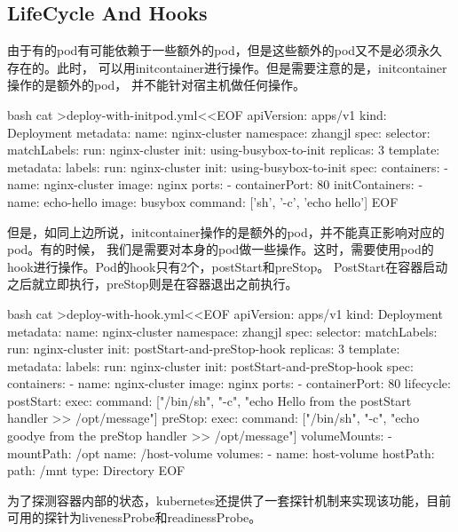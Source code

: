 \subsection{LifeCycle And Hooks}
由于有的pod有可能依赖于一些额外的pod，但是这些额外的pod又不是必须永久存在的。此时，
可以用initcontainer进行操作。但是需要注意的是，initcontainer操作的是额外的pod，
并不能针对宿主机做任何操作。
\begin{code-block}{bash}
cat >deploy-with-initpod.yml<<EOF
apiVersion: apps/v1
kind: Deployment
metadata:
  name: nginx-cluster
  namespace: zhangjl
spec:
  selector:
    matchLabels:
      run: nginx-cluster
      init: using-busybox-to-init
  replicas: 3
  template:
    metadata:
      labels:
        run: nginx-cluster
        init: using-busybox-to-init
    spec:
      containers:
      - name: nginx-cluster
        image: nginx
        ports:
        - containerPort: 80
      initContainers:
      - name: echo-hello
        image: busybox
        command: ['sh', '-c', 'echo hello']
EOF
\end{code-block}

但是，如同上边所说，initcontainer操作的是额外的pod，并不能真正影响对应的pod。有的时候，
我们是需要对本身的pod做一些操作。这时，需要使用pod的hook进行操作。Pod的hook只有2个，postStart和preStop。
PostStart在容器启动之后就立即执行，preStop则是在容器退出之前执行。
\begin{code-block}{bash}
cat >deploy-with-hook.yml<<EOF
apiVersion: apps/v1
kind: Deployment
metadata:
  name: nginx-cluster
  namespace: zhangjl
spec:
  selector:
    matchLabels:
      run: nginx-cluster
      init: postStart-and-preStop-hook
  replicas: 3
  template:
    metadata:
      labels:
        run: nginx-cluster
        init: postStart-and-preStop-hook
    spec:
      containers:
      - name: nginx-cluster
        image: nginx
        ports:
        - containerPort: 80
        lifecycle:
          postStart:
            exec:
              command: ["/bin/sh", "-c", "echo Hello from the postStart handler >> /opt/message"]
          preStop:
            exec:
              command: ["/bin/sh", "-c", "echo goodye from the preStop handler >> /opt/message"]
        volumeMounts:
          - mountPath: /opt
            name: /host-volume
      volumes:
      - name: host-volume
        hostPath:
          path: /mnt
          type: Directory
EOF
\end{code-block}

为了探测容器内部的状态，kubernetes还提供了一套探针机制来实现该功能，目前可用的探针为livenessProbe和readinessProbe。